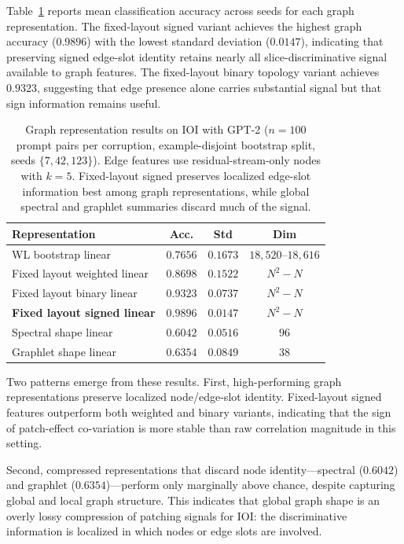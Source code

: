 \documentclass[11pt,a4paper]{article}
\begin{document}
Table~\ref{tab:main} reports mean classification accuracy across seeds for each graph representation. The fixed-layout signed variant achieves the highest graph accuracy ($0.9896$) with the lowest standard deviation ($0.0147$), indicating that preserving signed edge-slot identity retains nearly all slice-discriminative signal available to graph features. The fixed-layout binary topology variant achieves $0.9323$, suggesting that edge presence alone carries substantial signal but that sign information remains useful.

\begin{table}[H]
\centering
\small
\begin{tabular}{lccc}
\toprule
\textbf{Representation} & \textbf{Acc.} & \textbf{Std} & \textbf{Dim} \\
\midrule
WL bootstrap linear & $0.7656$ & $0.1673$ & $18,\!520$--$18,\!616$ \\
Fixed layout weighted linear & $0.8698$ & $0.1522$ & $N^2\!-\!N$ \\
Fixed layout binary linear & $0.9323$ & $0.0737$ & $N^2\!-\!N$ \\
\textbf{Fixed layout signed linear} & \textbf{$0.9896$} & \textbf{$0.0147$} & $N^2\!-\!N$ \\
Spectral shape linear & $0.6042$ & $0.0516$ & $96$ \\
Graphlet shape linear & $0.6354$ & $0.0849$ & $38$ \\
\bottomrule
\end{tabular}
\caption{Graph representation results on IOI with GPT-2 ($n=100$ prompt pairs per corruption, example-disjoint bootstrap split, seeds $\{7,42,123\}$). Edge features use residual-stream-only nodes with $k=5$. Fixed-layout signed preserves localized edge-slot information best among graph representations, while global spectral and graphlet summaries discard much of the signal.}
\label{tab:main}
\end{table}

Two patterns emerge from these results. First, high-performing graph representations preserve localized node/edge-slot identity. Fixed-layout signed features outperform both weighted and binary variants, indicating that the sign of patch-effect co-variation is more stable than raw correlation magnitude in this setting.

Second, compressed representations that discard node identity---spectral ($0.6042$) and graphlet ($0.6354$)---perform only marginally above chance, despite capturing global and local graph structure. This indicates that global graph shape is an overly lossy compression of patching signals for IOI: the discriminative information is localized in which nodes or edge slots are involved.
\end{document}
